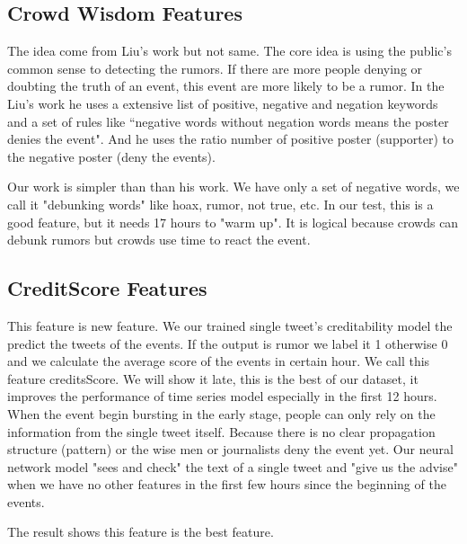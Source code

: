 \clearpage
\subsection{Crowd Wisdom Features}
The idea come from Liu's work \cite{liu2015real} but not same. The core idea is using the public's common sense to detecting the rumors. If there are more people denying or doubting the truth of an event, this event are more likely to be a rumor. 
In the Liu's work he uses a extensive list of positive, negative and negation keywords and a set of rules like “negative words without negation words means the poster denies the event". And he uses the ratio  number of positive  poster (supporter) to the negative poster (deny the events).

Our work is simpler than than his work. We have only a set of negative words, we call it "debunking words" like hoax, rumor, not true, etc.  In our test, this is a good feature, but it needs 17 hours to "warm up". It is logical because crowds can debunk rumors but crowds use time to react the event.

\subsection{CreditScore Features}
This feature is new feature. We our trained single tweet's creditability model the predict the tweets of the events. If the output is rumor we label it 1 otherwise 0 and we calculate the average score of the events in certain hour. We call this feature creditsScore. We will show it late, this is the best of our dataset, it improves the  performance of time series model especially in the first 12 hours. When the event begin bursting in the early stage, people can only rely on the information from the single tweet itself. Because there is no clear propagation structure (pattern) or the wise men or journalists deny the event yet. Our neural network model "sees and check" the text of a single tweet and "give us the advise" when we have no other features in the first few hours since the beginning of the events. 

The result shows this feature is the best feature.
 


